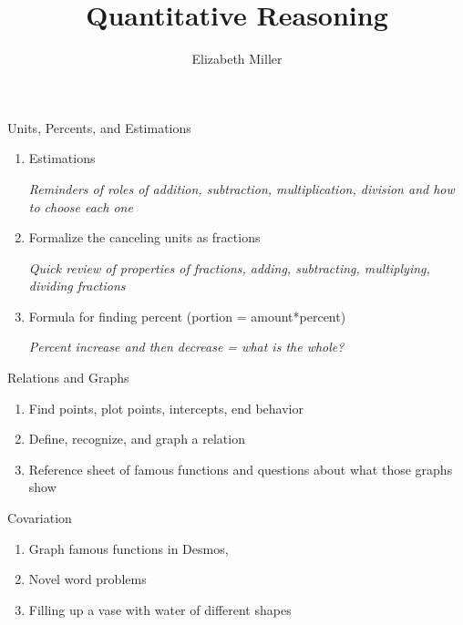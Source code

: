 \documentclass{ximera}
\author{Elizabeth Miller}
\title{Quantitative Reasoning}
\begin{document}
\begin{abstract}
\end{abstract}
\maketitle

\begin{overview}
\item Units, Percents, and Estimations %
	\begin{enumerate}
	\item Estimations 
	
	\textit{Reminders of roles of addition, subtraction, multiplication, division and how to choose each one} 
	
	\item Formalize the canceling units as fractions 
	
	\textit{Quick review of properties of fractions, adding, subtracting, multiplying, dividing fractions} 
	
	\item Formula for finding percent (portion = amount*percent) 
	
	\textit{Percent increase and then decrease = what is the whole?} 
	\end{enumerate}
	
\item Relations and Graphs %
	\begin{enumerate}
	
	\item Find points, plot points, intercepts, end behavior 

	\item Define, recognize, and graph a relation

	\item Reference sheet of famous functions and questions about what those graphs show 
	\end{enumerate} 

\item Covariation %
	\begin{enumerate}
	\item Graph famous functions in Desmos, %
	
	
	\item Novel word problems  %
	
	\item Filling up a vase with water of different shapes 
	\end{enumerate} 
\end{overview}
\end{document}

